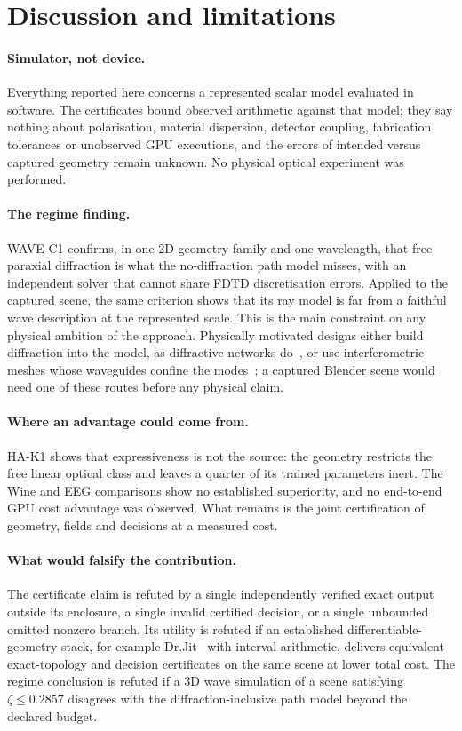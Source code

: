 \documentclass[11pt,a4paper]{article}
\begin{document}
\section{Discussion and limitations}
\label{sec:discussion}

\paragraph{Simulator, not device.} Everything reported here concerns a represented scalar model evaluated in software. The certificates bound observed arithmetic against that model; they say nothing about polarisation, material dispersion, detector coupling, fabrication tolerances or unobserved GPU executions, and the errors of intended versus captured geometry remain unknown. No physical optical experiment was performed.

\paragraph{The regime finding.} WAVE-C1 confirms, in one 2D geometry family and one wavelength, that free paraxial diffraction is what the no-diffraction path model misses, with an independent solver that cannot share FDTD discretisation errors. Applied to the captured scene, the same criterion shows that its ray model is far from a faithful wave description at the represented scale. This is the main constraint on any physical ambition of the approach. Physically motivated designs either build diffraction into the model, as diffractive networks do~\cite{lin2018}, or use interferometric meshes whose waveguides confine the modes~\cite{shen2017,clements2016}; a captured Blender scene would need one of these routes before any physical claim.

\paragraph{Where an advantage could come from.} HA-K1 shows that expressiveness is not the source: the geometry restricts the free linear optical class and leaves a quarter of its trained parameters inert. The Wine and EEG comparisons show no established superiority, and no end-to-end GPU cost advantage was observed. What remains is the joint certification of geometry, fields and decisions at a measured cost.

\paragraph{What would falsify the contribution.} The certificate claim is refuted by a single independently verified exact output outside its enclosure, a single invalid certified decision, or a single unbounded omitted nonzero branch. Its utility is refuted if an established differentiable-geometry stack, for example Dr.Jit~\cite{jakob2022} with interval arithmetic, delivers equivalent exact-topology and decision certificates on the same scene at lower total cost. The regime conclusion is refuted if a 3D wave simulation of a scene satisfying $\zeta \le 0.2857$ disagrees with the diffraction-inclusive path model beyond the declared budget.
\end{document}
